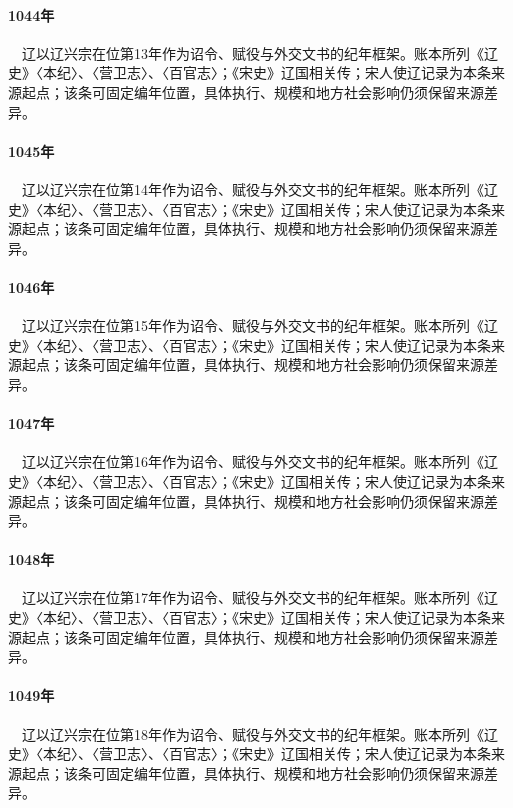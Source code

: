 \paragraph{1044年}　辽以辽兴宗在位第13年作为诏令、赋役与外交文书的纪年框架。账本所列《辽史》〈本纪〉、〈营卫志〉、〈百官志〉；《宋史》辽国相关传；宋人使辽记录为本条来源起点；该条可固定编年位置，具体执行、规模和地方社会影响仍须保留来源差异。

\paragraph{1045年}　辽以辽兴宗在位第14年作为诏令、赋役与外交文书的纪年框架。账本所列《辽史》〈本纪〉、〈营卫志〉、〈百官志〉；《宋史》辽国相关传；宋人使辽记录为本条来源起点；该条可固定编年位置，具体执行、规模和地方社会影响仍须保留来源差异。

\paragraph{1046年}　辽以辽兴宗在位第15年作为诏令、赋役与外交文书的纪年框架。账本所列《辽史》〈本纪〉、〈营卫志〉、〈百官志〉；《宋史》辽国相关传；宋人使辽记录为本条来源起点；该条可固定编年位置，具体执行、规模和地方社会影响仍须保留来源差异。

\paragraph{1047年}　辽以辽兴宗在位第16年作为诏令、赋役与外交文书的纪年框架。账本所列《辽史》〈本纪〉、〈营卫志〉、〈百官志〉；《宋史》辽国相关传；宋人使辽记录为本条来源起点；该条可固定编年位置，具体执行、规模和地方社会影响仍须保留来源差异。

\paragraph{1048年}　辽以辽兴宗在位第17年作为诏令、赋役与外交文书的纪年框架。账本所列《辽史》〈本纪〉、〈营卫志〉、〈百官志〉；《宋史》辽国相关传；宋人使辽记录为本条来源起点；该条可固定编年位置，具体执行、规模和地方社会影响仍须保留来源差异。

\paragraph{1049年}　辽以辽兴宗在位第18年作为诏令、赋役与外交文书的纪年框架。账本所列《辽史》〈本纪〉、〈营卫志〉、〈百官志〉；《宋史》辽国相关传；宋人使辽记录为本条来源起点；该条可固定编年位置，具体执行、规模和地方社会影响仍须保留来源差异。

